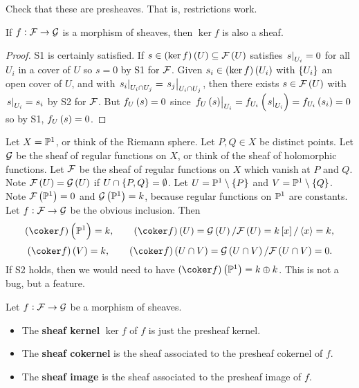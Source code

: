 \begin{exercise*}
Check that these are presheaves. That is, restrictions work.
\end{exercise*}

\begin{remark}
If $ f : \mathcal{F} \to \mathcal{G} $ is a morphism of sheaves, then $ \ker f $ is also a sheaf.
\end{remark}

\begin{proof}
S1 is certainly satisfied. If $ s \in \br{\ker f}\br{U} \subseteq \FFF\br{U} $ satisfies $ \left. s \right|_{U_i} = 0 $ for all $ U_i $ in a cover of $ U $ so $ s = 0 $ by S1 for $ \mathcal{F} $. Given $ s_i \in \br{\ker f}\br{U_i} $ with $ \cbr{U_i} $ an open cover of $ U $, and with $ \left. s_i \right|_{U_i \cap U_j} = \left. s_j \right|_{U_i \cap U_j} $, then there exists $ s \in \FFF\br{U} $ with $ \left. s \right|_{U_i} = s_i $ by S2 for $ \mathcal{F} $. But $ f_U\br{s} = 0 $ since $ \eval{f_U\br{s}}_{U_i} = f_{U_i}\br{\eval{s}_{U_i}} = f_{U_i}\br{s_i} = 0 $ so by S1, $ f_U\br{s} = 0 $.
\end{proof}

\begin{example*}
Let $ X = \mathbb{P}^1 $, or think of the Riemann sphere. Let $ P, Q \in X $ be distinct points. Let $ \mathcal{G} $ be the sheaf of regular functions on $ X $, or think of the sheaf of holomorphic functions. Let $ \mathcal{F} $ be the sheaf of regular functions on $ X $ which vanish at $ P $ and $ Q $. Note $ \FFF\br{U} = \GGG\br{U} $ if $ U \cap \cbr{P, Q} = \emptyset $. Let $ U = \PP^1 \setminus \cbr{P} $ and $ V = \PP^1 \setminus \cbr{Q} $. Note $ \FFF\br{\PP^1} = 0 $ and $ \GGG\br{\PP^1} = k $, because regular functions on $ \mathbb{P}^1 $ are constants. Let $ f : \mathcal{F} \to \mathcal{G} $ be the obvious inclusion. Then
$$ \br{\coker f}\br{\PP^1} = k, \qquad \br{\coker f}\br{U} = \GGG\br{U} / \FFF\br{U} = k\sbr{x} / \abr{x} = k, $$
$$ \br{\coker f}\br{V} = k, \qquad \br{\coker f}\br{U \cap V} = \GGG\br{U \cap V} / \FFF\br{U \cap V} = 0. $$
If S2 holds, then we would need to have $ \br{\coker f}\br{\PP^1} = k \oplus k $. This is not a bug, but a feature.
\end{example*}

\begin{definition*}
Let $ f : \mathcal{F} \to \mathcal{G} $ be a morphism of sheaves.
\begin{itemize}
\item The \textbf{sheaf kernel} $ \ker f $ of $ f $ is just the presheaf kernel.
\item The \textbf{sheaf cokernel} is the sheaf associated to the presheaf cokernel of $ f $.
\item The \textbf{sheaf image} is the sheaf associated to the presheaf image of $ f $.
\end{itemize}
\end{definition*}

